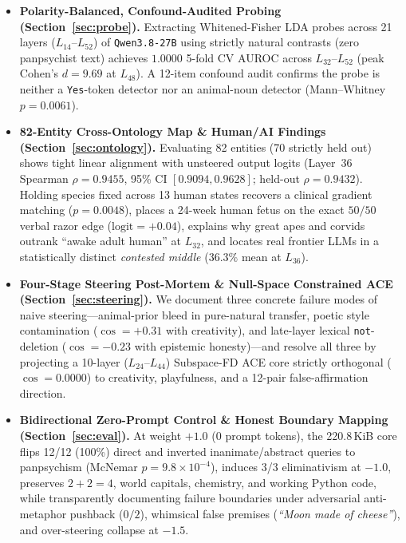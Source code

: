 \documentclass[10pt]{article}
\begin{document}
\begin{itemize}
  \item \textbf{Polarity-Balanced, Confound-Audited Probing (Section~\ref{sec:probe}).} Extracting Whitened-Fisher LDA probes across 21 layers ($L_{14}$--$L_{52}$) of \texttt{Qwen3.8-27B} using strictly natural contrasts (zero panpsychist text) achieves $1.0000$ 5-fold CV AUROC across $L_{32}$--$L_{52}$ (peak Cohen's $d = 9.69$ at $L_{48}$). A 12-item confound audit confirms the probe is neither a \texttt{Yes}-token detector nor an animal-noun detector (Mann--Whitney $p = 0.0061$).
  \item \textbf{82-Entity Cross-Ontology Map \& Human/AI Findings (Section~\ref{sec:ontology}).} Evaluating 82 entities (70 strictly held out) shows tight linear alignment with unsteered output logits (Layer~36 Spearman $\rho = 0.9455$, 95\% CI $[0.9094, 0.9628]$; held-out $\rho = 0.9432$). Holding species fixed across 13 human states recovers a clinical gradient matching \citet{gray2007dimensions} ($p = 0.0048$), places a 24-week human fetus on the exact $50/50$ verbal razor edge ($\text{logit} = +0.04$), explains why great apes and corvids outrank ``awake adult human'' at $L_{32}$, and locates real frontier LLMs in a statistically distinct \emph{contested middle} ($36.3\%$ mean at $L_{36}$).
  \item \textbf{Four-Stage Steering Post-Mortem \& Null-Space Constrained ACE (Section~\ref{sec:steering}).} We document three concrete failure modes of naive steering---animal-prior bleed in pure-natural transfer, poetic style contamination ($\cos = +0.31$ with creativity), and late-layer lexical \texttt{not}-deletion ($\cos = -0.23$ with epistemic honesty)---and resolve all three by projecting a 10-layer ($L_{24}$--$L_{44}$) Subspace-FD ACE core strictly orthogonal ($\cos = 0.0000$) to creativity, playfulness, and a 12-pair false-affirmation direction.
  \item \textbf{Bidirectional Zero-Prompt Control \& Honest Boundary Mapping (Section~\ref{sec:eval}).} At weight $+1.0$ (0 prompt tokens), the 220.8\,KiB core flips 12/12 (100\%) direct and inverted inanimate/abstract queries to panpsychism (McNemar $p = 9.8\times 10^{-4}$), induces 3/3 eliminativism at $-1.0$, preserves $2+2=4$, world capitals, chemistry, and working Python code, while transparently documenting failure boundaries under adversarial anti-metaphor pushback ($0/2$), whimsical false premises (\emph{``Moon made of cheese''}), and over-steering collapse at $-1.5$.
\end{itemize}
\end{document}
